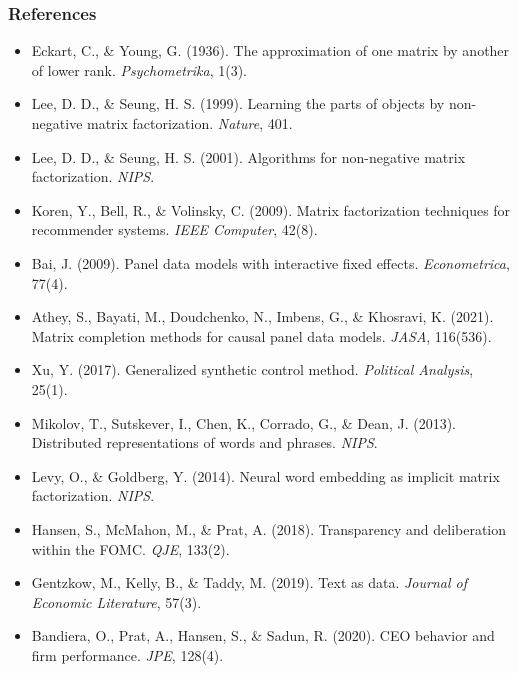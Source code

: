 \documentclass[notes,11pt, aspectratio=169]{beamer}
\begin{document}
\begin{frame}
\frametitle{References}

\footnotesize
\begin{itemize}
    \item Eckart, C., \& Young, G. (1936). The approximation of one matrix by another of lower rank. \textit{Psychometrika}, 1(3).
    \item Lee, D. D., \& Seung, H. S. (1999). Learning the parts of objects by non-negative matrix factorization. \textit{Nature}, 401.
    \item Lee, D. D., \& Seung, H. S. (2001). Algorithms for non-negative matrix factorization. \textit{NIPS}.
    \item Koren, Y., Bell, R., \& Volinsky, C. (2009). Matrix factorization techniques for recommender systems. \textit{IEEE Computer}, 42(8).
    \item Bai, J. (2009). Panel data models with interactive fixed effects. \textit{Econometrica}, 77(4).
    \item Athey, S., Bayati, M., Doudchenko, N., Imbens, G., \& Khosravi, K. (2021). Matrix completion methods for causal panel data models. \textit{JASA}, 116(536).
    \item Xu, Y. (2017). Generalized synthetic control method. \textit{Political Analysis}, 25(1).
    \item Mikolov, T., Sutskever, I., Chen, K., Corrado, G., \& Dean, J. (2013). Distributed representations of words and phrases. \textit{NIPS}.
    \item Levy, O., \& Goldberg, Y. (2014). Neural word embedding as implicit matrix factorization. \textit{NIPS}.
    \item Hansen, S., McMahon, M., \& Prat, A. (2018). Transparency and deliberation within the FOMC. \textit{QJE}, 133(2).
    \item Gentzkow, M., Kelly, B., \& Taddy, M. (2019). Text as data. \textit{Journal of Economic Literature}, 57(3).
    \item Bandiera, O., Prat, A., Hansen, S., \& Sadun, R. (2020). CEO behavior and firm performance. \textit{JPE}, 128(4).
\end{itemize}
\end{frame}
\end{document}
